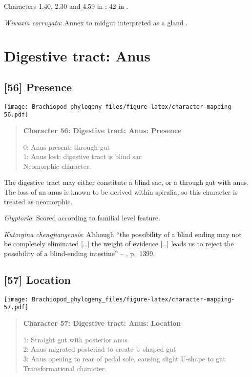 \documentclass[openany]{book}
\theoremstyle{definition}
\theoremstyle{definition}
\theoremstyle{definition}
\theoremstyle{remark}
\begin{document}
Characters 1.40, 2.30 and 4.59 in \citet{SPS1996}; 42 in
\citet{Haszprunar2000}.

\hypertarget{Wiwaxia_corrugata-coding-55}{}
\emph{Wiwaxia corrugata}: Annex to midgut interpreted as a gland
\citep{Smith2012M}.

\section{Digestive tract: Anus}\label{digestive-tract-anus}

\subsection*{{[}56{]} Presence}\label{presence-2}

\texttt{[image: Brachiopod\_phylogeny\_files/figure-latex/character-mapping-56.pdf]}

\begin{quote}
\textbf{Character 56: Digestive tract: Anus: Presence}

0: Anus present: through-gut\\
1: Anus lost: digestive tract is blind sac\\
Neomorphic character.
\end{quote}

The digestive tract may either constitute a blind sac, or a through gut
with anus. The loss of an anus is known to be derived within spiralia,
so this character is treated as neomorphic.

\hypertarget{Glyptoria-coding-56}{}
\emph{Glyptoria}: Scored according to familial level feature.

\hypertarget{Kutorgina_chengjiangensis-coding-56}{}
\emph{Kutorgina chengjiangensis}: Although ``the possibility of a blind
ending may not be completely eliminated {[}\ldots{}{]} the weight of
evidence {[}\ldots{}{]} leads us to reject the possibility of a
blind-ending intestine'' --
\citet{Zhang2007Rhynchonelliformeanbrachiopods}, p.~1399.

\subsection*{{[}57{]} Location}\label{location}

\texttt{[image: Brachiopod\_phylogeny\_files/figure-latex/character-mapping-57.pdf]}

\begin{quote}
\textbf{Character 57: Digestive tract: Anus: Location}

1: Straight gut with posterior anus\\
2: Anus migrated posteriad to create U-shaped gut\\
3: Anus opening to rear of pedal sole, causing slight U-shape to gut\\
Transformational character.
\end{quote}
\end{document}
